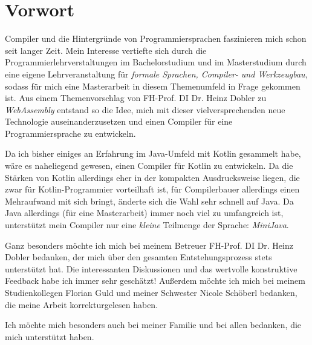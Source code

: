 \chapter{Vorwort}
 
Compiler und die Hintergründe von Programmiersprachen faszinieren mich schon seit langer Zeit. Mein Interesse vertiefte sich durch die Programmierlehrverstaltungen im Bachelorstudium und im Masterstudium durch eine eigene Lehrveranstaltung für \emph{formale Sprachen, Compiler- und Werkzeugbau}, sodass für mich eine Masterarbeit in diesem Themenumfeld in Frage gekommen ist. Aus einem Themenvorschlag von  FH-Prof. DI Dr. Heinz Dobler zu \emph{WebAssembly} entstand so die Idee, mich mit dieser vielversprechenden neue Technologie auseinanderzusetzen und einen Compiler für eine Programmiersprache zu entwickeln.

Da ich bisher einiges an Erfahrung im Java-Umfeld mit Kotlin gesammelt habe, wäre es naheliegend gewesen, einen Compiler für Kotlin zu entwickeln. Da die Stärken von Kotlin allerdings eher in der kompakten Ausdrucksweise liegen, die zwar für Kotlin-Programmier vorteilhaft ist, für Compilerbauer allerdings einen Mehraufwand mit sich bringt, änderte sich die Wahl sehr schnell auf Java. Da Java allerdings (für eine Masterarbeit) immer noch viel zu umfangreich ist, unterstützt mein Compiler nur eine \emph{kleine} Teilmenge der Sprache: \emph{MiniJava}.

Ganz besonders möchte ich mich bei meinem Betreuer FH-Prof. DI Dr. Heinz Dobler bedanken, der mich über den gesamten Entstehungsprozess stets unterstützt hat. Die interessanten Diskussionen und das wertvolle konstruktive Feedback habe ich immer sehr geschätzt! Außerdem möchte ich mich bei meinem Studienkollegen Florian Guld und meiner Schwester Nicole Schöberl bedanken, die meine Arbeit korrekturgelesen haben.

Ich möchte mich besonders auch bei meiner Familie und bei allen bedanken, die mich unterstützt haben.
